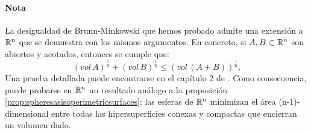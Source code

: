 \paragraph{Nota}{La desigualdad de Brunn-Minkowski que hemos probado admite una extensión a $\mathbb{R}^n$ que se demuestra con los mismos argumentos. En concreto, si $A,B \subset \mathbb{R}^n$ son abiertos y acotados, entonces se cumple que:
\begin{equation*}
    (vol \, A)^{\frac{1}{n}} + (vol \, B)^{\frac{1}{n}} \leq (vol \, (A+B))^{\frac{1}{n}}.
\end{equation*}
%
Una prueba detallada puede encontrarse en el capítulo 2 de \cite{geometricinequalities}.
Como consecuencia, puede probarse en $\mathbb{R}^n$ un resultado análogo a la proposición \ref{prop:spheresasisoperimetricsurfaces}: las esferas de $\mathbb{R}^n$ minimizan el área (n-$1$)-dimensional entre todas las hipersuperficies conexas y compactas que encierran un volumen dado.}
